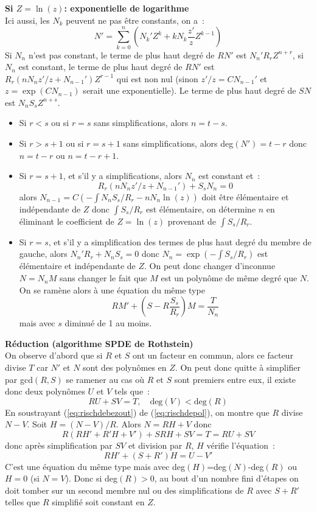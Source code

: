 \documentclass[a4paper,11pt]{article}
\begin{document}
\begin{giacjshere}
{\bf Si $Z=\ln(z)$: exponentielle de logarithme}\\
Ici aussi, les $N_k$ peuvent ne pas être constants, on a~:
\[ N'=\sum_{k=0}^n (N_k'Z^k+kN_k \frac{z'}{z} Z^{k-1})\]
Si $N_n$ n'est pas constant, le terme de plus haut degré de 
$RN'$ est $N_n' R_r Z^{n+r}$, si $N_n$ est constant, 
le terme de plus haut degré de $RN'$ est $R_r(nN_nz'/z+N_{n-1}') Z^{r-1}$ 
qui est non nul (sinon $z'/z=CN_{n-1}'$ et $z=\exp(CN_{n-1})$ serait 
une exponentielle).
Le terme de plus haut degré de $SN$ est $N_n S_s Z^{n+s}$.
\begin{itemize}
\item Si $r<s$ ou si $r=s$ sans simplifications,
alors $n=t-s$.
\item Si $r>s+1$ ou si $r=s+1$ sans simplifications,
alors deg$(N')=t-r$ donc $n=t-r$ ou $n=t-r+1$.
\item Si $r=s+1$, et s'il y a simplifications, alors $N_n$ est constant et~:
\[ R_r(nN_nz'/z+N_{n-1}')+ S_s N_n = 0 \]
alors $N_{n-1}=C (-\int N_n S_s/R_r -n N_n \ln(z))$
doit être élémentaire et indépendante de $Z$ donc $\int S_s/R_r$
est élémentaire, on détermine $n$ en éliminant le coefficient de 
$Z=\ln(z)$ provenant de $\int S_s/R_r$.
\item Si $r=s$, et s'il y a simplification des termes 
de plus haut degré du membre de gauche, 
alors $N_n' R_r+N_n S_s=0$ donc $N_n=\exp(-\int S_s/R_r)$
est élémentaire et indépendante de $Z$. On peut donc changer
d'inconnue $N=N_n M$ sans changer le fait que $M$ est un polynôme de
même degré que $N$. On se ramène alors à une équation du même type
\[ RM'+(S-R \frac{S_s}{R_r})M= \frac{T}{N_n}\]
mais avec $s$ diminué de 1 au moins.
\end{itemize}

{\bf R\'eduction (algorithme SPDE de Rothstein)}\\
On observe d'abord que si $R$ et $S$ ont un facteur
en commun, alors ce facteur divise $T$ car $N'$ et $N$ sont des polyn\^omes
en $Z$. On peut donc quitte \`a simplifier par gcd$(R,S)$ se ramener
au cas o\`u $R$ et $S$ sont premiers entre eux, il existe donc deux
polyn\^omes $U$ et $V$ tels que~:
\begin{equation} \label{eq:rischdebezout}
RU+SV=T, \quad \mbox{deg}(V)< \mbox{deg}(R)
\end{equation}
En soustrayant (\ref{eq:rischdebezout}) de (\ref{eq:rischdepol}), 
on montre que $R$ divise $N-V$. Soit $H=(N-V)/R$. Alors $N=RH+V$ donc
\[ R (RH'+R'H+V')+SRH+SV= T=RU+SV\]
donc apr\`es simplification par $SV$ et division par $R$, 
$H$ v\'erifie l'\'equation~:
\[ R H' + (S+R') H = U - V'\]
C'est une \'equation du m\^eme type mais avec deg$(H)$=deg$(N)$-deg$(R)$
ou $H=0$ (si $N=V$).
Donc si deg$(R)>0$, au bout d'un nombre fini d'\'etapes on doit 
tomber sur un second membre nul ou des simplifications de $R$ avec $S+R'$
telles que $R$ simplifié soit constant en $Z$.


\end{giacjshere}
\end{document}
